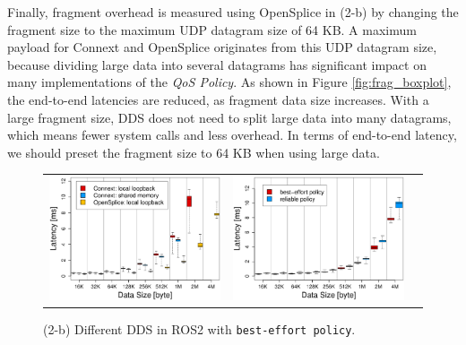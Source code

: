 \documentclass{sig-alternate-05-2015}
\begin{document}
Finally, fragment overhead is measured using OpenSplice in (2-b) by changing the fragment size to the maximum UDP datagram size of 64 KB. 
A maximum payload for Connext and OpenSplice originates from this UDP datagram size, because dividing large data into several datagrams has significant impact on many implementations of the \emph{QoS Policy}.
As shown in Figure \ref{fig:frag_boxplot}, the end-to-end latencies are reduced, as fragment data size increases.
With a large fragment size, DDS does not need to split large data into many datagrams, which means fewer system calls and less overhead.
In terms of end-to-end latency, we should preset the fragment size to 64 KB when using large data.
\begin{figure}[t]
  \begin{tabular}{ccc}
    \begin{minipage}[t]{0.31\textwidth}
      \includegraphics[width=1.0\linewidth]{../figure/comparison_DDS_BoxPlot.eps}
      \caption{(2-b) Different DDS in ROS2 with \texttt{best-effort policy}.}
      \label{fig:dds_boxplot}
    \end{minipage}
    &
      \begin{minipage}[t]{0.31\textwidth}
        \includegraphics[width=1.0\linewidth]{../figure/comparison_qos_BoxPlot.eps}

\end{minipage}
\end{tabular}
\end{figure}
\end{document}
